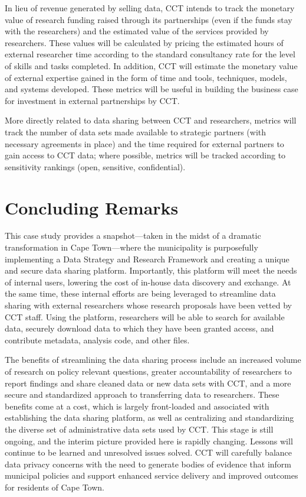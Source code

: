 In lieu of revenue generated by selling data, CCT intends to track the monetary value of research funding raised through its partnerships (even if the funds stay with the researchers) and the estimated value of the services provided by researchers. These values will be calculated by pricing the estimated hours of external researcher time according to the standard consultancy rate for the level of skills and tasks completed. In addition, CCT will estimate the monetary value of external expertise gained in the form of time and tools, techniques, models, and systems developed. These metrics will be useful in building the business case for investment in external partnerships by CCT.

More directly related to data sharing between CCT and researchers, metrics will track the number of data sets made available to strategic partners (with necessary agreements in place) and the time required for external partners to gain access to CCT data; where possible, metrics will be tracked according to sensitivity rankings (open, sensitive, confidential).

\hypertarget{concluding-remarks-2}{%
\section{Concluding Remarks}\label{concluding-remarks-2}}

This case study provides a snapshot---taken in the midst of a dramatic transformation in Cape Town---where the municipality is purposefully implementing a Data Strategy and Research Framework and creating a unique and secure data sharing platform. Importantly, this platform will meet the needs of internal users, lowering the cost of in-house data discovery and exchange. At the same time, these internal efforts are being leveraged to streamline data sharing with external researchers whose research proposals have been vetted by CCT staff. Using the platform, researchers will be able to search for available data, securely download data to which they have been granted access, and contribute metadata, analysis code, and other files.

The benefits of streamlining the data sharing process include an increased volume of research on policy relevant questions, greater accountability of researchers to report findings and share cleaned data or new data sets with CCT, and a more secure and standardized approach to transferring data to researchers. These benefits come at a cost, which is largely front-loaded and associated with establishing the data sharing platform, as well as centralizing and standardizing the diverse set of administrative data sets used by CCT. This stage is still ongoing, and the interim picture provided here is rapidly changing. Lessons will continue to be learned and unresolved issues solved. CCT will carefully balance data privacy concerns with the need to generate bodies of evidence that inform municipal policies and support enhanced service delivery and improved outcomes for residents of Cape Town.

